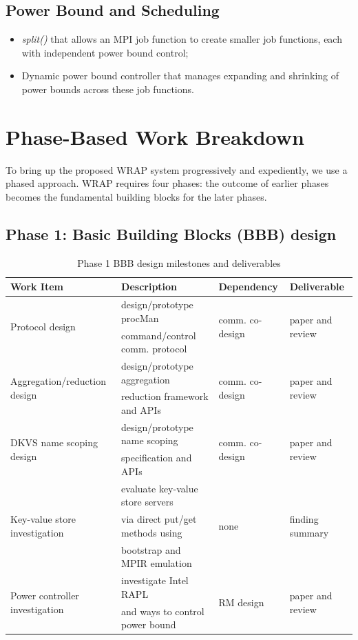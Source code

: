 \documentclass[10pt]{article}
\begin{document}
\subsection{Power Bound and Scheduling}
\begin{itemize}
\item{{\em split()} that allows an MPI job function to create smaller job functions, each with independent power bound control;}
\item{Dynamic power bound controller that manages expanding and shrinking of power bounds across these job functions.}
\end{itemize}

\section{Phase-Based Work Breakdown}
To bring up the proposed WRAP system progressively and expediently, we use a phased approach. 
WRAP requires four phases: the outcome of earlier phases becomes the fundamental 
building blocks for the later phases. 
 
\subsection{Phase 1: Basic Building Blocks (BBB) design} 

\begin{table}
\centering
\begin{tabular}{|l|l|l|l|}
\hline
Work Item & Description & Dependency & Deliverable \\
\hline
\multirow{2}{*}{Protocol design} & design/prototype procMan & \multirow{2}{*}{comm. co-design} & \multirow{2}{*}{paper and review} \\
& command/control comm. protocol & & \\ \hline
\multirow{2}{*}{Aggregation/reduction design} & design/prototype aggregation &  \multirow{2}{*}{comm. co-design} & \multirow{2}{*}{paper and review} \\
& reduction framework and APIs & & \\ \hline
\multirow{2}{*}{DKVS name scoping design} & design/prototype name scoping & \multirow{2}{*}{comm. co-design} & \multirow{2}{*}{paper and review} \\
& specification and APIs & & \\ \hline
\multirow{3}{*}{Key-value store investigation}& evaluate key-value store servers & \multirow{3}{*}{none} & \multirow{3}{*}{finding summary} \\
& via direct put/get methods using & & \\
& bootstrap and MPIR emulation& & \\ \hline 
\multirow{2}{*}{Power controller investigation} & investigate Intel RAPL &  \multirow{2}{*}{RM design} & \multirow{2}{*}{paper and review} \\
& and ways to control power bound & & \\ \hline
\end{tabular}
\caption{Phase 1 BBB design milestones and deliverables}
\label{tab:phase1}
\end{table}
\end{document}
